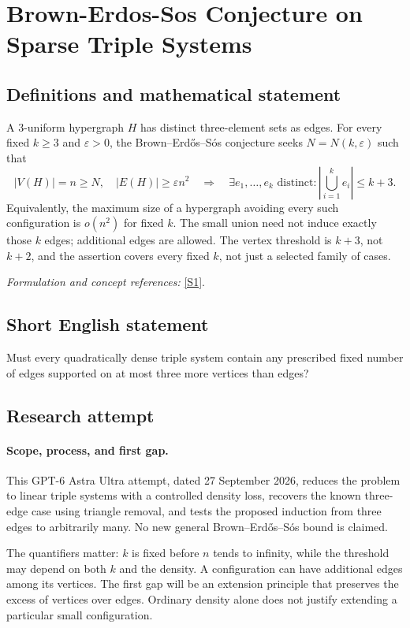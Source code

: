\documentclass[11pt]{article}
\begin{document}
\section*{\texorpdfstring{Brown-Erdos-Sos Conjecture on Sparse Triple Systems}{Brown-Erdos-Sos Conjecture on Sparse Triple Systems}}\label{30006917}
\subsection{Definitions and mathematical statement}
A $3$-uniform hypergraph $H$ has distinct three-element sets as edges. For every fixed $k\ge3$ and ${\varepsilon}>0$, the Brown--Erd\H{o}s--S\'os conjecture seeks $N=N(k,{\varepsilon})$ such that
\[
 |V(H)|=n\ge N,\quad |E(H)|\ge{\varepsilon} n^2
 \quad\Longrightarrow\quad
 \exists e_1,\ldots,e_k\text{ distinct}:\left|\bigcup_{i=1}^k e_i\right|\le k+3.
\]
Equivalently, the maximum size of a hypergraph avoiding every such configuration is $o(n^2)$ for fixed $k$. The small union need not induce exactly those $k$ edges; additional edges are allowed. The vertex threshold is $k+3$, not $k+2$, and the assertion covers every fixed $k$, not just a selected family of cases.
\par\smallskip\textit{Formulation and concept references:} \href{https://www.math.tau.ac.il/~asafico/bes.pdf}{[S1]}.

\subsection{Short English statement}
Must every quadratically dense triple system contain any prescribed fixed number of edges supported on at most three more vertices than edges?
\subsection{Research attempt}
\paragraph{Scope, process, and first gap.}
This GPT-6 Astra Ultra attempt, dated 27 September 2026, reduces the problem to linear triple systems with a controlled density loss, recovers the known three-edge case using triangle removal, and tests the proposed induction from three edges to arbitrarily many. No new general Brown--Erd\H{o}s--S\'os bound is claimed.

The quantifiers matter: $k$ is fixed before $n$ tends to infinity, while the threshold may depend on both $k$ and the density. A configuration can have additional edges among its vertices. The first gap will be an extension principle that preserves the excess of vertices over edges. Ordinary density alone does not justify extending a particular small configuration.
\end{document}
